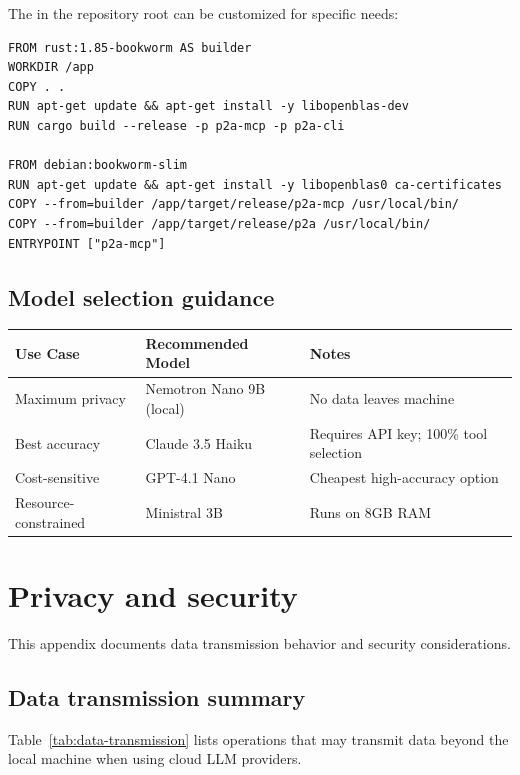 The  in the repository root can be customized for specific needs:
\begin{verbatim}
FROM rust:1.85-bookworm AS builder
WORKDIR /app
COPY . .
RUN apt-get update && apt-get install -y libopenblas-dev
RUN cargo build --release -p p2a-mcp -p p2a-cli

FROM debian:bookworm-slim
RUN apt-get update && apt-get install -y libopenblas0 ca-certificates
COPY --from=builder /app/target/release/p2a-mcp /usr/local/bin/
COPY --from=builder /app/target/release/p2a /usr/local/bin/
ENTRYPOINT ["p2a-mcp"]
\end{verbatim}

\subsection{Model selection guidance}

\begin{center}
\small
\begin{tabular}{llp{5cm}}
\toprule
Use Case & Recommended Model & Notes \\
\midrule
Maximum privacy & Nemotron Nano 9B (local) & No data leaves machine \\
Best accuracy & Claude 3.5 Haiku & Requires API key; 100\% tool selection \\
Cost-sensitive & GPT-4.1 Nano & Cheapest high-accuracy option \\
Resource-constrained & Ministral 3B & Runs on 8GB RAM \\
\bottomrule
\end{tabular}
\end{center}


\section{Privacy and security} \label{app:privacy}
\setcounter{table}{0}
\setcounter{figure}{0}

This appendix documents data transmission behavior and security considerations.

\subsection{Data transmission summary}

Table~\ref{tab:data-transmission} lists operations that may transmit data
beyond the local machine when using cloud LLM providers.

